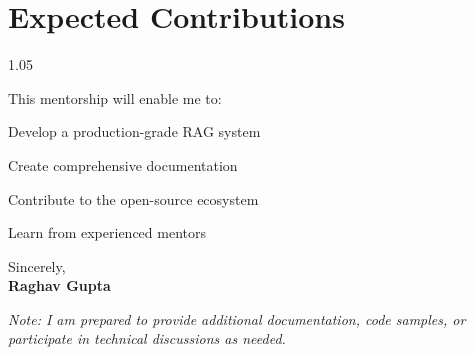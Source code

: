 \documentclass[10pt, letterpaper]{article}
\newenvironment{proposalsection}{
    \begin{spacing}{1.05}
    \begin{minipage}{\linewidth}
    \setlength{\parskip}{0.15cm}
}{
    \end{minipage}
    \end{spacing}
    \vspace{0.05cm}}
\newcommand{\closing}[1]{\vspace{0.2cm}\noindent #1,\\[0.2cm]}
\begin{document}
\section{Expected Contributions}
\begin{proposalsection}
This mentorship will enable me to:
\begin{proposallist}
\item Develop a production-grade RAG system
\item Create comprehensive documentation
\item Contribute to the open-source ecosystem
\item Learn from experienced mentors
\end{proposallist}
\end{proposalsection}

\closing{Sincerely}
\textbf{Raghav Gupta}

\vspace{0.2cm}
\emph{Note: I am prepared to provide additional documentation, code samples, or participate in technical discussions as needed.}
\end{document}
